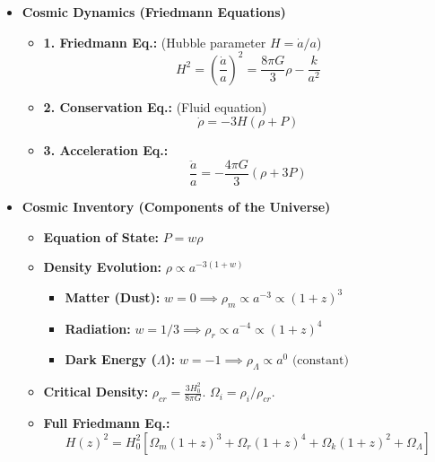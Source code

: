 \documentclass{sciposter}
\begin{document}
\begin{multicols}{3}
\begin{itemize}
    \item \textbf{Cosmic Dynamics (Friedmann Equations)}
    \begin{itemize}
        \item \textbf{1. Friedmann Eq.:} (Hubble parameter $H = \dot{a}/a$)
        $$H^2 = \left(\frac{\dot{a}}{a}\right)^2 = \frac{8\pi G}{3}\rho - \frac{k}{a^2}$$
        \item \textbf{2. Conservation Eq.:} (Fluid equation)
        $$\dot{\rho} = -3H(\rho + P)$$
        \item \textbf{3. Acceleration Eq.:}
        $$\frac{\ddot{a}}{a} = -\frac{4\pi G}{3}(\rho + 3P)$$
    \end{itemize}

    \item \textbf{Cosmic Inventory (Components of the Universe)}
    \begin{itemize}
        \item \textbf{Equation of State:} $P = w\rho$
        \item \textbf{Density Evolution:} $\rho \propto a^{-3(1+w)}$
        \begin{itemize}
            \item \textbf{Matter (Dust):} $w=0 \implies \rho_m \propto a^{-3} \propto (1+z)^3$
            \item \textbf{Radiation:} $w=1/3 \implies \rho_r \propto a^{-4} \propto (1+z)^4$
            \item \textbf{Dark Energy ($\Lambda$):} $w=-1 \implies \rho_\Lambda \propto a^{0} \text{ (constant)}$
        \end{itemize}
        \item \textbf{Critical Density:} $\rho_{cr} = \frac{3H_0^2}{8\pi G}$. $\Omega_i = \rho_i / \rho_{cr}$.
        \item \textbf{Full Friedmann Eq.:}
        $$H(z)^2 = H_0^2 \left[ \Omega_m(1+z)^3 + \Omega_r(1+z)^4 + \Omega_k(1+z)^2 + \Omega_\Lambda \right]$$
    \end{itemize}


\end{itemize}
\end{multicols}
\end{document}
